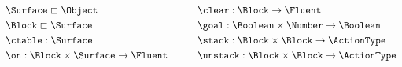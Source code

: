 \vspace{-0.03in}
  \begin{equation*}
    \begin{aligned}\
      &\Surface \sqsubset \Object \\
      &\Block \sqsubset \Surface \\
      &\ctable: \Surface \\
      &\on: \Block \times \Surface \rightarrow \Fluent
             \end{aligned} \hspace{30pt}
 \begin{aligned}
      &\clear: \Block \rightarrow \Fluent \\
      &\goal: \Boolean \times \Number \rightarrow \Boolean \\
      &\stack: \Block \times \Block \rightarrow \ActionType \\
      &\unstack: \Block \times \Block \rightarrow \ActionType
    \end{aligned}
  \end{equation*}
\vspace{-0.05in}
